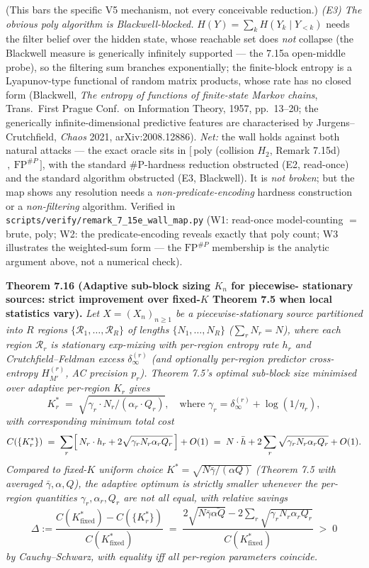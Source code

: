 \documentclass[
]{article}
\begin{document}
(This bars the specific V5 mechanism, not every conceivable reduction.) \emph{(E3) The obvious
poly algorithm is Blackwell-blocked.} $H(Y)=\sum_k H(Y_k\mid Y_{<k})$ needs the filter
belief over the hidden state, whose reachable set does \emph{not} collapse (the
Blackwell measure is generically infinitely supported --- the 7.15a open-middle
probe), so the filtering sum branches exponentially; the finite-block entropy is a
Lyapunov-type functional of random matrix products, whose rate has no closed form
(Blackwell, \emph{The entropy of functions of finite-state Markov chains}, Trans.\
First Prague Conf.\ on Information Theory, 1957, pp.\ 13--20; the generically
infinite-dimensional predictive features are characterised by Jurgens--Crutchfield,
\emph{Chaos} 2021, arXiv:2008.12886). \emph{Net:} the wall
holds against both natural attacks --- the exact oracle sits in $[\,$poly (collision
$H_2$, Remark 7.15d)$\,,\ \mathrm{FP}^{\#P}\,]$, with the standard \#P-hardness
reduction obstructed (E2, read-once) and the standard algorithm obstructed (E3,
Blackwell). It is \emph{not broken}; but the map shows any resolution needs a
\emph{non-predicate-encoding} hardness construction or a \emph{non-filtering}
algorithm. Verified in \texttt{scripts/verify/remark\_7\_15e\_wall\_map.py} (W1:
read-once model-counting $=$ brute, poly; W2: the predicate-encoding reveals exactly
that poly count; W3 illustrates the weighted-sum form --- the
$\mathrm{FP}^{\#P}$ membership is the analytic argument above, not a numerical check).

\textbf{Theorem 7.16 (Adaptive sub-block sizing $K_n$ for piecewise-
stationary sources: strict improvement over fixed-$K$ Theorem 7.5
when local statistics vary).}
\emph{Let $X = (X_n)_{n \geq 1}$ be a piecewise-stationary source
partitioned into $R$ regions $\{\mathcal{R}_1, \ldots, \mathcal{R}_R\}$
of lengths $\{N_1, \ldots, N_R\}$ ($\sum_r N_r = N$), where each
region $\mathcal{R}_r$ is stationary exp-mixing with per-region entropy
rate $h_r$ and Crutchfield--Feldman excess $\delta_\infty^{(r)}$ (and
optionally per-region predictor cross-entropy $H_{M'}^{(r)}$, AC
precision $p_r$). Theorem 7.5's optimal sub-block size minimised over
\emph{adaptive} per-region $K_r$ gives}
\[
K_r^* \;=\; \sqrt{\gamma_r \cdot N_r / (\alpha_r \cdot Q_r)},
\quad\text{where } \gamma_r = \delta_\infty^{(r)} + \log(1/\eta_r),
\]
\emph{with corresponding minimum total cost}
\[
C(\{K_r^*\}) \;=\; \sum_r \Bigl[\,N_r \cdot h_r + 2 \sqrt{\gamma_r N_r \alpha_r Q_r}\,\Bigr] + O(1)
\;=\;
N \cdot \bar{h} + 2 \sum_r \sqrt{\gamma_r N_r \alpha_r Q_r} + O(1).
\]
\emph{Compared to fixed-$K$ uniform choice $K^* = \sqrt{N \bar{\gamma}/(\alpha Q)}$
(Theorem 7.5 with averaged $\bar{\gamma}, \alpha, Q$), the adaptive
optimum is \emph{strictly smaller} whenever the per-region quantities
$\gamma_r, \alpha_r, Q_r$ are not all equal, with relative savings}
\[
\Delta := \frac{C(K^*_{\text{fixed}}) - C(\{K_r^*\})}{C(K^*_{\text{fixed}})}
\;=\;
\frac{2 \sqrt{N \bar{\gamma} \bar{\alpha Q}} - 2 \sum_r \sqrt{\gamma_r N_r \alpha_r Q_r}}{C(K^*_{\text{fixed}})}
\;>\; 0
\]
\emph{by Cauchy--Schwarz, with equality iff all per-region parameters
coincide.}
\end{document}
